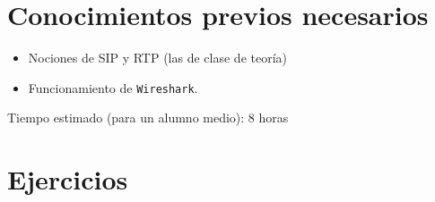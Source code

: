 \documentclass[11pt,a4paper]{article}
\begin{document}
\section{Conocimientos previos necesarios}

\begin{itemize}
  \item Nociones de SIP y RTP (las de clase de teoría)
  \item Funcionamiento de \texttt{Wireshark}.
\end{itemize}

Tiempo estimado (para un alumno medio): 8 horas


\section{Ejercicios}
\end{document}
